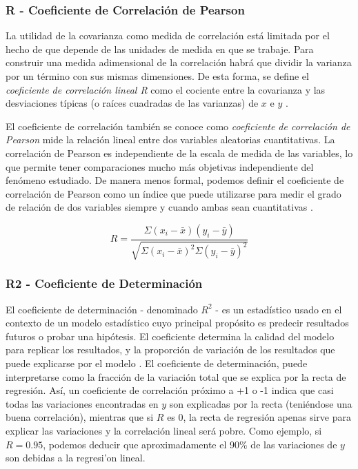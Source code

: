 \subsubsection{R - Coeficiente de Correlación de Pearson}
La utilidad de la covarianza como medida de correlación está limitada por el hecho de que depende de las unidades de medida en que se trabaje. Para construir una medida adimensional de la correlación habrá que dividir la varianza por un término con sus mismas dimensiones. De esta forma, se define el \emph{coeficiente de correlación lineal R} como el cociente entre la covarianza y las desviaciones típicas (o raíces cuadradas de las varianzas) de $x$ e $y$ \cite{estadisticaBasica}.

El coeficiente de correlación también se conoce como \emph{coeficiente de correlación de Pearson} mide la relación lineal entre dos variables aleatorias cuantitativas. La correlación de Pearson es independiente de la escala de medida de las variables, lo que permite tener comparaciones mucho más objetivas independiente del fenómeno estudiado. De manera menos formal, podemos definir el coeficiente de correlación de Pearson como un índice que puede utilizarse para medir el grado de relación de dos variables siempre y cuando ambas sean cuantitativas \cite{intoStats7}.

\begin{equation}
    R = \frac{\Sigma(x_i - \bar{x})(y_i - \bar{y})}{\sqrt{\Sigma(x_i - \bar{x})^2\Sigma(y_i - \bar{y})^2}}
\end{equation}

\subsubsection{R2 - Coeficiente de Determinación}
El coeficiente de determinación - denominado \(R^{2}\) - es un estadístico usado en el contexto de un modelo estadístico cuyo principal propósito es predecir resultados futuros o probar una hipótesis. El coeficiente determina la calidad del modelo para replicar los resultados, y la proporción de variación de los resultados que puede explicarse por el modelo \cite{daroczi}. El coeficiente de determinación, puede interpretarse como la fracción de la variación total que se explica por la recta de regresión. Así, un coeficiente de correlación próximo a +1 o -1 indica que casi todas las variaciones encontradas en $y$ son explicadas por la recta (teniéndose una buena correlación), mientras que si $R$ es 0, la recta de regresión apenas sirve para explicar las variaciones y la correlación lineal será pobre. Como ejemplo, si $R = 0.95$, podemos deducir que aproximadamente el 90\% de las variaciones de $y$ son debidas a la regresi'on lineal.


